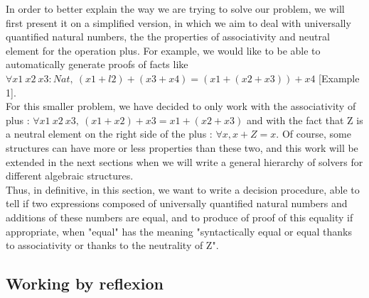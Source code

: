 \documentclass{sigplanconf}
\begin{document}
In order to better explain the way we are trying to solve our problem, we will first present it on a simplified version, in which we aim to deal with universally quantified natural numbers, the the properties of associativity and neutral element for the operation plus.
For example, we would like to be able to automatically generate proofs of facts like $\forall x1\ x2\ x3:Nat,\ (x1 + l2) + (x3 + x4) = (x1 + (x2 + x3)) + x4$ [Example 1]. \\
For this smaller problem, we have decided to only work with the associativity of plus : $\forall x1\ x2\ x3,\ (x1 + x2) + x3 = x1 + (x2 + x3)$ and with the fact that Z is a neutral element on the right side of the plus : $\forall x, x + Z = x$. Of course, some structures can have more or less properties than these two, and this work will be extended in the next sections when we will write a general hierarchy of solvers for different algebraic structures. \\
Thus, in definitive, in this section, we want to write a decision procedure, able to tell if two expressions composed of universally quantified natural numbers and additions of these numbers are equal, and to produce of proof of this equality if appropriate, when "equal" has the meaning "syntactically equal or equal thanks to associativity or thanks to the neutrality of Z". \\


\subsection{Working by reflexion}
\end{document}
